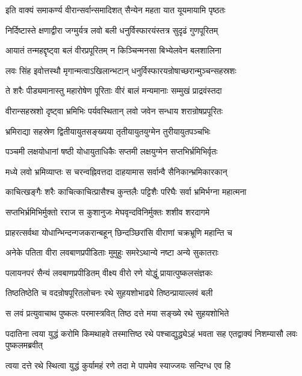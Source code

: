 \twolineshloka
{इति वाक्यं समाकर्ण्य वीरान्सर्वान्समादिशत्}
{सैन्येन महता यात यूयमायामि पृष्ठतः}%

\twolineshloka
{निर्दिष्टास्ते क्षणाद्वीरा जग्मुर्यत्र लवो बली}
{धनुर्विस्फारयंस्तत्र सुदृढं गुणपूरितम्}%

\twolineshloka
{आयातं तन्महद्दृष्ट्वा बलं वीरप्रपूरितम्}
{न किञ्चिन्मनसा बिभ्येलवेन बलशालिना}%

\twolineshloka
{लवः सिंह इवोत्तस्थौ मृगान्मत्वाऽखिलान्भटान्}
{धनुर्विस्फारयन्रोषाच्छरान्मुञ्चन्सहस्रशः}%

\twolineshloka
{ते शरैः पीड्यमानास्तु महारोषेण पूरिताः}
{वीरं बालं मन्यमानाः सम्मुखं प्राद्रवंस्तदा}%

\twolineshloka
{वीरान्सहस्रशो दृष्ट्वा भ्रमिभिः पर्यवस्थितान्}
{लवो जवेन सन्धाय शरान्रोषप्रपूरितः}%

\twolineshloka
{भ्रमिराद्या सहस्रेण द्वितीयायुतसङ्ख्यया}
{तृतीयायुतयुग्मेन तुरीयायुतपञ्चभिः}%

\twolineshloka
{पञ्चमी लक्षयोधानां षष्ठी योधायुताधिकैः}
{सप्तमी लक्षयुग्मेन सप्तभिर्भ्रमिभिर्वृतः}%

\twolineshloka
{मध्ये लवो भ्रमिव्याप्तः स चरन्वह्निवत्तदा}
{दाहयामास सर्वान्वै सैनिकान्भ्रमिकारकान्}%

\twolineshloka
{काचित्खङ्गैः शरैः काचित्काचित्प्रासैश्च कुन्तलैः}
{पट्टिशैः परिघैः सर्वा भ्रमिर्भग्ना महात्मना}%

\twolineshloka
{सप्तभिर्भ्रमिभिर्मुक्तो रराज स कुशानुजः}
{मेघवृन्दविनिर्मुक्तः शशीव शरदागमे}%

\twolineshloka
{प्राहरत्सर्वथा योधान्भिन्दन्गजकरान्बहून्}
{छिन्दञ्छिरांसि वीराणां चक्रभ्रूणि महान्ति च}%

\twolineshloka
{अनेके पतिता वीरा लवबाणप्रपीडिताः}
{मुमुहुः समरेऽथान्ये नष्टा अन्ये सुकातराः}%

\twolineshloka
{पलायनपरं सैन्यं लवबाणप्रपीडितम्}
{वीक्ष्य वीरो रणे योद्धुं प्रायात्पुष्कलसंज्ञकः}%

\twolineshloka
{तिष्ठतिष्ठेति च वदन्रोषपूरितलोचनः}
{रथे सुहयशोभाढ्ये तिष्ठन्प्रायाल्लवं बली}%

\twolineshloka
{स लवं प्रत्युवाचाथ पुष्कलः परमास्त्रवित्}
{तिष्ठ दत्ते मया सङ्ख्ये रथे सुहयशोभिते}%


\threelineshloka
{पदातिना त्वया युद्धं करोमि किमथाहवे}
{तस्मात्तिष्ठ रथे पश्चाद्युद्ध्येऽहं भवता सह}
{एतद्वाक्यं निशम्यासौ लवः पुष्कलमब्रवीत्}%

\twolineshloka
{त्वया दत्ते रथे स्थित्वा युद्धं कुर्यामहं रणे}
{तदा मे पापमेव स्याज्जयः सन्दिग्ध एव हि}%

